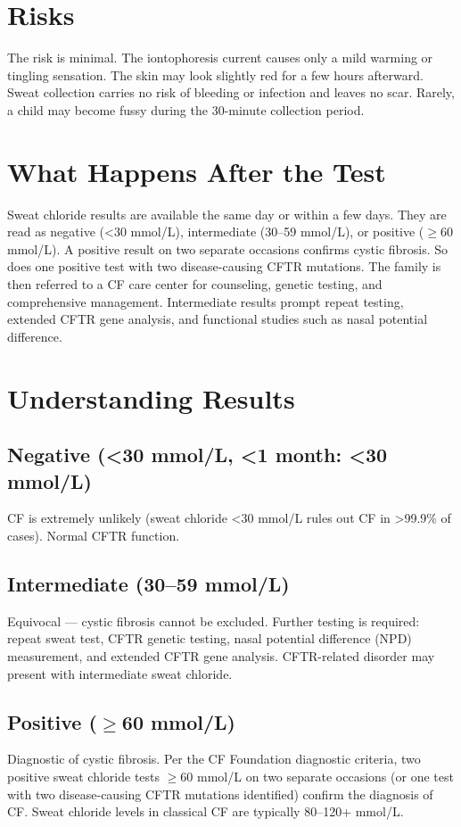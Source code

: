 \section*{Risks}
The risk is minimal. The iontophoresis current causes only a mild warming or tingling sensation. The skin may look slightly red for a few hours afterward. Sweat collection carries no risk of bleeding or infection and leaves no scar. Rarely, a child may become fussy during the 30-minute collection period.
\section*{What Happens After the Test}
Sweat chloride results are available the same day or within a few days. They are read as negative (<30 mmol/L), intermediate (30--59 mmol/L), or positive ($\geq$60 mmol/L). A positive result on two separate occasions confirms cystic fibrosis. So does one positive test with two disease-causing CFTR mutations. The family is then referred to a CF care center for counseling, genetic testing, and comprehensive management. Intermediate results prompt repeat testing, extended CFTR gene analysis, and functional studies such as nasal potential difference.
\section*{Understanding Results}
\subsection*{Negative (<30 mmol/L, <1 month: <30 mmol/L)}
CF is extremely unlikely (sweat chloride <30 mmol/L rules out CF in >99.9\% of cases). Normal CFTR function.
\subsection*{Intermediate (30--59 mmol/L)}
Equivocal --- cystic fibrosis cannot be excluded. Further testing is required: repeat sweat test, CFTR genetic testing, nasal potential difference (NPD) measurement, and extended CFTR gene analysis. CFTR-related disorder may present with intermediate sweat chloride.
\subsection*{Positive ($\geq$60 mmol/L)}
Diagnostic of cystic fibrosis. Per the CF Foundation diagnostic criteria, two positive sweat chloride tests $\geq$60 mmol/L on two separate occasions (or one test with two disease-causing CFTR mutations identified) confirm the diagnosis of CF. Sweat chloride levels in classical CF are typically 80--120+ mmol/L.
